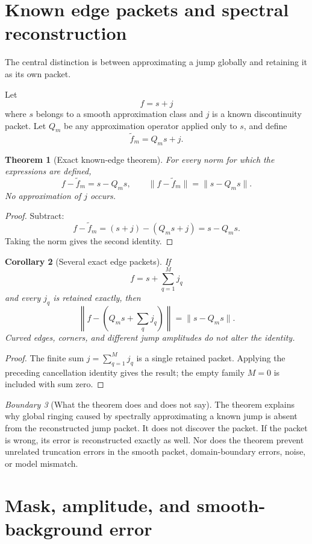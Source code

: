 \documentclass[11pt]{article}
\newtheorem{theorem}{Theorem}[section]
\newtheorem{corollary}[theorem]{Corollary}
\theoremstyle{definition}
\theoremstyle{remark}
\newtheorem{boundary}[theorem]{Boundary}
\begin{document}
\section{Known edge packets and spectral reconstruction}

The central distinction is between approximating a jump globally and retaining it as its own packet.

Let
\[
f=s+j
\]
where $s$ belongs to a smooth approximation class and $j$ is a known discontinuity packet. Let $Q_m$ be any approximation operator applied only to $s$, and define
\[
\widetilde f_m=Q_ms+j.
\]

\begin{theorem}[Exact known-edge theorem]\label{result:10}
For every norm for which the expressions are defined,
\[
\boxed{
f-\widetilde f_m=s-Q_ms,
\qquad
\|f-\widetilde f_m\|=\|s-Q_ms\|.
}
\]
No approximation of $j$ occurs.
\end{theorem}

\begin{proof}
Subtract:
\[
f-\widetilde f_m=(s+j)-(Q_ms+j)=s-Q_ms.
\]
Taking the norm gives the second identity.
\end{proof}

\begin{corollary}[Several exact edge packets]\label{result:11}
If
\[
f=s+\sum_{q=1}^{M}j_q
\]
and every $j_q$ is retained exactly, then
\[
\left\|f-\left(Q_ms+\sum_qj_q\right)\right\|
=\|s-Q_ms\|.
\]
Curved edges, corners, and different jump amplitudes do not alter the identity.
\end{corollary}
\begin{proof}
The finite sum $j=\sum_{q=1}^M j_q$ is a single retained packet. Applying the preceding cancellation identity gives the result; the empty family $M=0$ is included with sum zero.
\end{proof}

\begin{boundary}[What the theorem does and does not say]
The theorem explains why global ringing caused by spectrally approximating a known jump is absent from the reconstructed jump packet. It does not discover the packet. If the packet is wrong, its error is reconstructed exactly as well. Nor does the theorem prevent unrelated truncation errors in the smooth packet, domain-boundary errors, noise, or model mismatch.
\end{boundary}

\section{Mask, amplitude, and smooth-background error}
\end{document}
